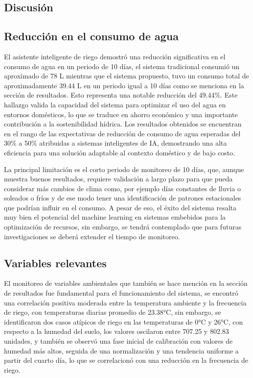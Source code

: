 \documentclass[pdflatex,sn-mathphys-num]{sn-jnl}%
\theoremstyle{thmstyleone}%
\theoremstyle{thmstyletwo}%
\theoremstyle{thmstylethree}%
\begin{document}
\begin{multicols}{2}
\justifying

\section*{Discusión}

\subsection*{Reducción en el consumo de agua}

El asistente inteligente de riego demostró una reducción significativa en el consumo de agua en un periodo de 10 días, el sistema tradicional consumió un aproximado de 78 L mientras que el sistema propuesto, tuvo un consumo total de aproximadamente 39.44 L en un periodo igual a 10 días como se menciona en la sección de resultados. Esto representa una notable reducción del 49.44\%. Este hallazgo valida la capacidad del sistema para optimizar el uso del agua en entornos domésticos, lo que se traduce en ahorro económico y una importante contribución a la sostenibilidad hídrica. Los resultados obtenidos se encuentran en el rango de las expectativas de reducción de consumo de agua esperadas del 30\% a 50\% atribuidas a sistemas inteligentes de IA, demostrando una alta eficiencia para una solución adaptable al contexto doméstico y de bajo costo.

La principal limitación es el corto periodo de monitoreo de 10 días, que, aunque muestra buenos resultados, requiere validación a largo plazo para que pueda considerar más cambios de clima como, por ejemplo días constantes de lluvia o soleados o fríos y de ese modo tener una identificación de patrones estacionales que podrían influir en el consumo. A pesar de eso, el éxito del sistema resalta muy bien el potencial del machine learning en sistemas embebidos para la optimización de recursos, sin embargo, se tendrá contemplado que para futuras investigaciones se deberá extender el tiempo de monitoreo.

\subsection*{Variables relevantes}
El monitoreo de variables ambientales que también se hace mención en la sección de resultados fue fundamental para el funcionamiento del sistema, se encontró una correlación positiva moderada entre la temperatura ambiente y la frecuencia de riego, con temperaturas diarias promedio de 23.38°C, sin embargo, se identificaron dos casos atípicos de riego en las temperaturas de 0°C y 26°C, con respecto a la humedad del suelo, los valores oscilaron entre 707.25 y 802.83 unidades, y también se observó una fase inicial de calibración con valores de humedad más altos, seguida de una normalización y una tendencia uniforme a partir del cuarto día, lo que se correlacionó con una reducción en la frecuencia de riego.


\end{multicols}
\end{document}

